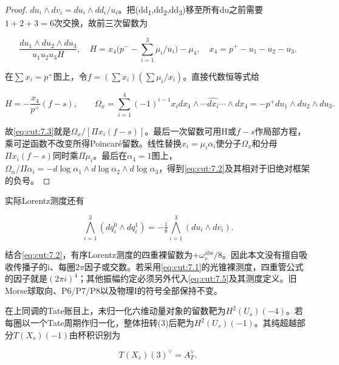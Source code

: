 \documentclass[11pt,a4paper,oneside]{ctexart}
\theoremstyle{cnplain}
\theoremstyle{definition}
\theoremstyle{remark}
\numberwithin{equation}{section}
\begin{document}
\begin{proof}

\(du_i\wedge dv_i=du_i\wedge dd_i/u_i\)。把(dd\textsubscript{1},dd\textsubscript{2},dd\textsubscript{3})移至所有du之前需要\(1+2+3=6\)次交换，故前三次留数为

\begin{equation}
\frac{du_1\wedge du_2\wedge du_3}{u_1u_2u_3H},\quad
 H=x_4\Big(p^- -\sum_{i=1}^3\mu_i/u_i\Big)-\mu_4,
 \quad x_4=p^+-u_1-u_2-u_3.                           \label{eq:cut:7.3}
\end{equation}

在\(\sum x_i=p^+\)图上，令\(f=(\sum x_i)(\sum \mu _i/x_i)\)。直接代数恒等式给

\begin{equation}
H=-\frac{x_4}{p^+}(f-s),\qquad
 \Omega_x=\sum_{i=1}^4(-1)^{i-1}x_i
             dx_1\wedge\cdots\widehat{dx_i}\cdots\wedge dx_4
            =-p^+du_1\wedge du_2\wedge du_3.           \label{eq:cut:7.4}
\end{equation}

故\eqref{eq:cut:7.3}就是\(\Omega _x/[\Pi x_i(f- s)]\)。最后一次留数可用H或\(f- s\)作局部方程，乘可逆函数不改变所得Poincaré留数。线性替换\(x_i=\mu _i\alpha _i\)使分子\(\Omega _x\)和分母\(\Pi x_i(f- s)\)同时乘\(\Pi \mu _i\)。最后在\(\alpha _{4}=1\)图上，\(\Omega _\alpha /\Pi \alpha _i=- d\log \alpha _{1}\wedge d\log \alpha _{2}\wedge d\log \alpha _{3}\)，得到\eqref{eq:cut:7.2}及其相对于旧绝对框架的负号。

\end{proof}

实际Lorentz测度还有

\begin{equation}
\bigwedge_{i=1}^3(dq_i^0\wedge dq_i^1)
       =-\tfrac18\bigwedge_{i=1}^3(du_i\wedge dv_i).  \label{eq:cut:7.5}
\end{equation}

结合\eqref{eq:cut:7.2}，有序Lorentz测度的四重裸留数为\(+\omega _s^{\mathrm{abs}}/8\)。因此本文没有擅自吸收传播子的i、每圈\(2\pi \)因子或交数。若采用\eqref{eq:cut:7.1}的光锥裸测度，四重管公式的因子就是\((2\pi i)^{4}\)；其他振幅约定必须另外代入\eqref{eq:cut:7.5}及其测度定义。旧Morse球取向、P6/P7/P8以及物理I的符号全部保持不变。

在上同调的Tate账目上，未归一化六维动量对象的留数靶为\(H^{2}(U_s)(- 4)\)。若每圈以一个Tate周期作归一化，整体扭转(3)后靶为\(H^{2}(U_s)(- 1)\)。其纯超越部分\(T(X_s)(- 1)\)由杯积识别为

\begin{equation}
T(X_s)(3)^\vee=A_T^\vee.            \label{eq:cut:7.6}
\end{equation}
\end{document}
